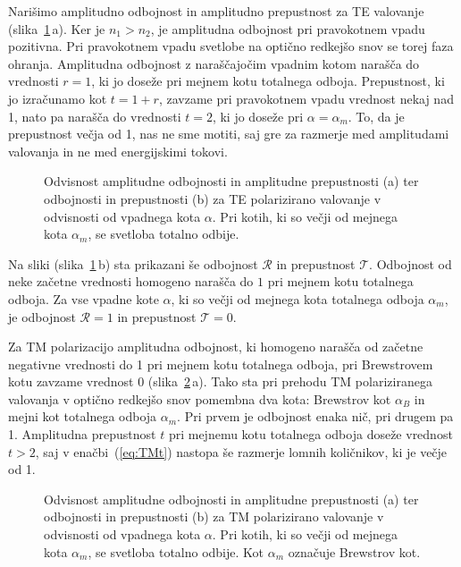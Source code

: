 Narišimo amplitudno odbojnost in amplitudno prepustnost za TE valovanje 
(slika~\ref{fig:04_goste}\,a). 
Ker je $n_1>n_2$, je amplitudna odbojnost pri pravokotnem vpadu pozitivna. 
Pri pravokotnem vpadu svetlobe na optično redkejšo snov se torej
faza ohranja. Amplitudna odbojnost z naraščajočim vpadnim kotom narašča 
do vrednosti $r=1$, ki jo doseže pri mejnem kotu totalnega odboja. 
Prepustnost, ki jo izračunamo
kot $t = 1+r$, zavzame pri pravokotnem vpadu vrednost nekaj nad 1,
nato pa narašča do vrednosti $t=2$, ki jo doseže pri $\alpha = \alpha_m$. 
To, da je prepustnost večja od 1, nas ne sme motiti, saj gre za
razmerje med amplitudami valovanja in ne med energijskimi tokovi.
\begin{figure}[ht]
\centering
\def\svgwidth{140truemm} 

\caption{Odvisnost amplitudne odbojnosti in amplitudne prepustnosti (a) ter odbojnosti in 
prepustnosti (b) za TE polarizirano valovanje v odvisnosti od vpadnega kota $\alpha$. 
Pri kotih, ki so večji od mejnega kota $\alpha_m$, se svetloba totalno odbije.}
\label{fig:04_goste}
\end{figure}

Na sliki (slika~\ref{fig:04_goste}\,b) sta prikazani še odbojnost $\mathcal{R}$ 
in prepustnost $\mathcal{T}$. Odbojnost od neke začetne vrednosti homogeno
narašča do $1$ pri mejnem kotu totalnega odboja. Za vse vpadne kote $\alpha$, ki
so večji od mejnega kota totalnega odboja $\alpha_m$, je odbojnost $\mathcal{R} = 1$ in 
prepustnost $\mathcal{T} = 0$.

Za TM polarizacijo amplitudna odbojnost, ki homogeno
narašča od začetne negativne vrednosti do 1 pri mejnem
kotu totalnega odboja, pri Brewstrovem kotu zavzame vrednost 0 (slika~\ref{fig:04_gostm}\,a). 
Tako sta pri prehodu TM polariziranega valovanja v optično redkejšo
snov pomembna dva kota: Brewstrov kot $\alpha_B$ in mejni kot totalnega odboja $\alpha_m$.
Pri prvem je odbojnost enaka nič, pri drugem pa 1. Amplitudna prepustnost $t$ pri mejnemu kotu 
totalnega odboja doseže vrednost $t>2$,
saj v enačbi~(\ref{eq:TMt}) nastopa še razmerje lomnih količnikov, ki je 
večje od 1. 
\begin{figure}[ht]
\centering
\def\svgwidth{140truemm} 

\caption{Odvisnost amplitudne odbojnosti in amplitudne prepustnosti (a) ter odbojnosti in 
prepustnosti (b) za TM polarizirano valovanje v odvisnosti od vpadnega kota $\alpha$. 
Pri kotih, ki so večji od mejnega kota $\alpha_m$, se svetloba totalno odbije. Kot $\alpha_m$
označuje Brewstrov kot.}
\label{fig:04_gostm}
\end{figure}

